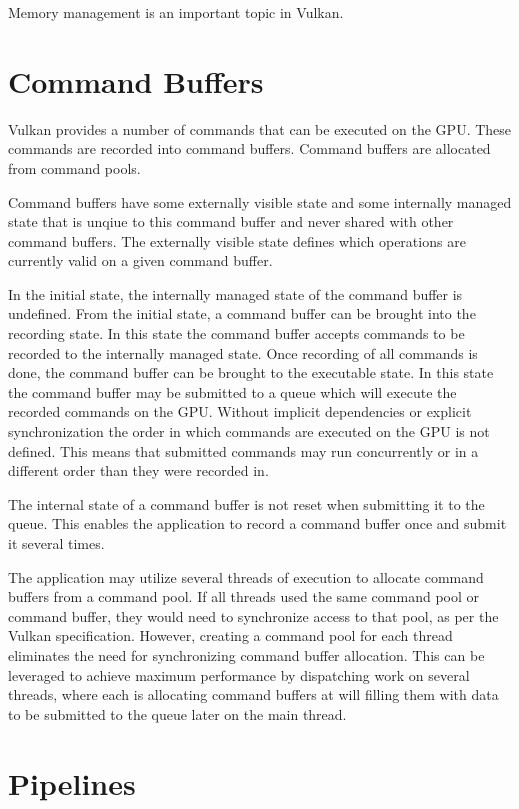     Memory management is an important topic in Vulkan.

    \tbd

  \section{Command Buffers}
  \label{sec:CommandBuffers}
    Vulkan provides a number of commands that can be executed on the GPU. These commands are recorded into command buffers. Command buffers are allocated from command pools.

    Command buffers have some externally visible state and some internally managed state that is unqiue to this command buffer and never shared with other command buffers. The externally visible state defines which operations are currently valid on a given command buffer.

    In the initial state, the internally managed state of the command buffer is undefined. From the initial state, a command buffer can be brought into the recording state. In this state the command buffer accepts commands to be recorded to the internally managed state. Once recording of all commands is done, the command buffer can be brought to the executable state. In this state the command buffer may be submitted to a queue which will execute the recorded commands on the GPU. Without implicit dependencies or explicit synchronization the order in which commands are executed on the GPU is not defined. This means that submitted commands may run concurrently or in a different order than they were recorded in.

    The internal state of a command buffer is not reset when submitting it to the queue. This enables the application to record a command buffer once and submit it several times.

    The application may utilize several threads of execution to allocate command buffers from a command pool. If all threads used the same command pool or command buffer, they would need to synchronize access to that pool, as per the Vulkan specification. However, creating a command pool for each thread eliminates the need for synchronizing command buffer allocation. This can be leveraged to achieve maximum performance by dispatching work on several threads, where each is allocating command buffers at will filling them with data to be submitted to the queue later on the main thread.

  \section{Pipelines}


